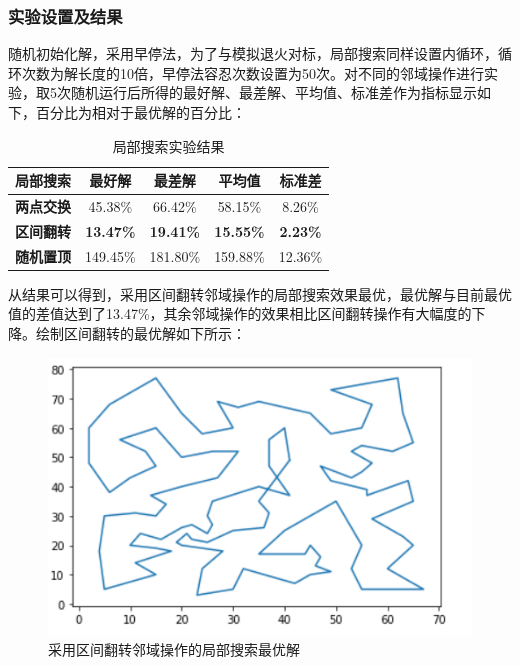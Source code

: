 \documentclass[withoutpreface,bwprint]{cumcmthesis} %
\begin{document}
\subsubsection{实验设置及结果}
随机初始化解，采用早停法，为了与模拟退火对标，局部搜索同样设置内循环，循环次数为解长度的10倍，早停法容忍次数设置为50次。对不同的邻域操作进行实验，取5次随机运行后所得的最好解、最差解、平均值、标准差作为指标显示如下，百分比为相对于最优解的百分比：
\begin{table}[H]
\centering
\caption{局部搜索实验结果}
\begin{tabular}{|c|c|c|c|c|}
\hline
\textbf{局部搜索} & \textbf{最好解}     & \textbf{最差解}     & \textbf{平均值}     & \textbf{标准差}    \\ \hline
\textbf{两点交换} & 45.38\%          & 66.42\%          & 58.15\%          & 8.26\%          \\ \hline
\textbf{区间翻转} & \textbf{13.47\%} & \textbf{19.41\%} & \textbf{15.55\%} & \textbf{2.23\%} \\ \hline
\textbf{随机置顶} & 149.45\%         & 181.80\%         & 159.88\%         & 12.36\%         \\ \hline
\end{tabular}
\end{table}
从结果可以得到，采用区间翻转邻域操作的局部搜索效果最优，最优解与目前最优值的差值达到了13.47\%，其余邻域操作的效果相比区间翻转操作有大幅度的下降。绘制区间翻转的最优解如下所示：
\begin{figure}[H]
		\centering
		\includegraphics[width=0.5\linewidth]{ls_b}
		\caption{采用区间翻转邻域操作的局部搜索最优解}
\end{figure}
\end{document}
